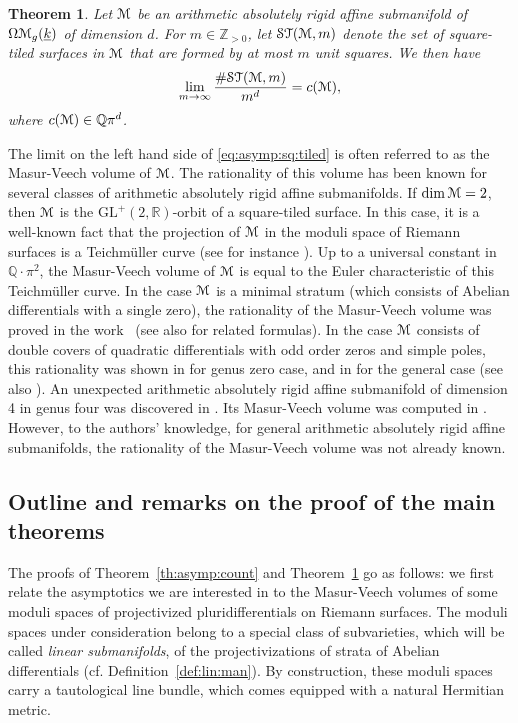 \documentclass[11pt]{article}
\newcommand{\cf}{cf.\xspace}
\numberwithin{equation}{section}
\let\mathcal\EuScript
\theoremstyle{plain}
\newtheorem{Theorem}{Theorem}[section]
\theoremstyle{definition}
\newcommand{\R}{\mathbb{R}}
\newcommand\Z{\mathbb{Z}}
\newcommand{\Q}{\mathbb{Q}}
\newcommand{\Mcal}{\mathcal{M}}
\newcommand{\cM}{\mathcal{M}}
\newcommand{\ST}{\mathcal{ST}}
\newcommand{\GL}{\mathrm{GL}}
\let\ul\underline
\newcommand{\trate}{\Omega\Mcal_{g}(\ul{k})}
\begin{document}
\begin{Theorem}\label{th:aff:subman:count}
Let $\Mcal$ be an \emph{arithmetic absolutely rigid} affine submanifold of $\trate$ of dimension $d$. For $m\in \Z_{>0}$, let $\ST(\Mcal,m)$ denote the set of square-tiled surfaces in $\Mcal$ that are formed by at most $m$ unit squares. We then have
\begin{equation}\label{eq:asymp:sq:tiled}
\lim_{m \to \infty}\frac{\#\ST(\Mcal,m)}{m^{d}}=c(\Mcal),
\end{equation}
where $c(\Mcal) \in \Q\pi^{d}$.
\end{Theorem}
The limit on the left hand side of \eqref{eq:asymp:sq:tiled} is often referred to as the Masur-Veech volume of $\cM$.
The rationality of this volume has been known for several classes of arithmetic absolutely rigid affine submanifolds.
If $\dim \cM=2$, then $\cM$ is the $\GL^+(2,\R)$\nobreakdash-orbit of a square-tiled surface. In this case, it is a well-known fact that the projection of $\cM$ in the moduli space of Riemann surfaces is a Teichmüller curve (see for instance \cite{SW04}). Up to a universal constant in $\Q\cdot\pi^2$, the Masur-Veech volume of $\cM$ is equal to the Euler characteristic of this Teichmüller curve.
In the case $\cM$ is a minimal stratum (which consists of Abelian differentials with a single zero), the rationality of the Masur-Veech volume was proved in the work~\cite{EO01} (see also \cite{Sau18} for related formulas). In the case $\cM$ consists of double covers of quadratic differentials with odd order zeros and simple poles, this rationality was shown in \cite{AEZ16} for genus zero case, and in \cite{CMS19} for the general case (see also \cite{EO06,Goujard}).
An unexpected arithmetic absolutely rigid affine submanifold of dimension 4 in genus four was discovered in \cite{MMW17}.
Its Masur-Veech volume was computed in \cite{TT19}.
However, to the authors' knowledge, for general arithmetic absolutely rigid affine submanifolds, the rationality of the Masur-Veech volume was not already known.

\subsection{Outline and remarks on the proof of the main theorems}\label{subsec:outline}
The proofs of Theorem~\ref{th:asymp:count} and Theorem~\ref{th:aff:subman:count} go as follows: we first relate the asymptotics we are interested in to the Masur-Veech volumes of some moduli spaces of projectivized pluri\-differentials on Riemann surfaces. The moduli spaces under consideration belong to a special class of subvarieties, which will be called \emph{linear submanifolds}, of the projectivizations of strata of Abelian differentials (\cf Definition~\ref{def:lin:man}). By construction, these moduli spaces carry a tautological line bundle, which comes equipped with a natural Hermitian metric.
\end{document}
